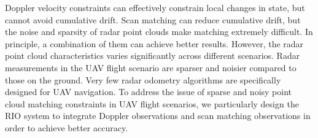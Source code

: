Doppler velocity constraints can effectively constrain local changes in state, but cannot avoid cumulative drift. Scan matching can reduce cumulative drift, but the noise and sparsity of radar point clouds make matching extremely difficult. In principle, a combination of them can achieve better results.
However, the radar point cloud characteristics  varies significantly across different scenarios. Radar measurements  in the UAV flight scenario are sparser and noisier compared to those on the ground.
Very few radar odometry algorithms are specifically designed for UAV navigation.
To address the issue of sparse and noisy point cloud matching constraints in UAV flight scenarios, we particularly design the RIO system to integrate Doppler observations and scan matching observations in order to achieve better  accuracy.
